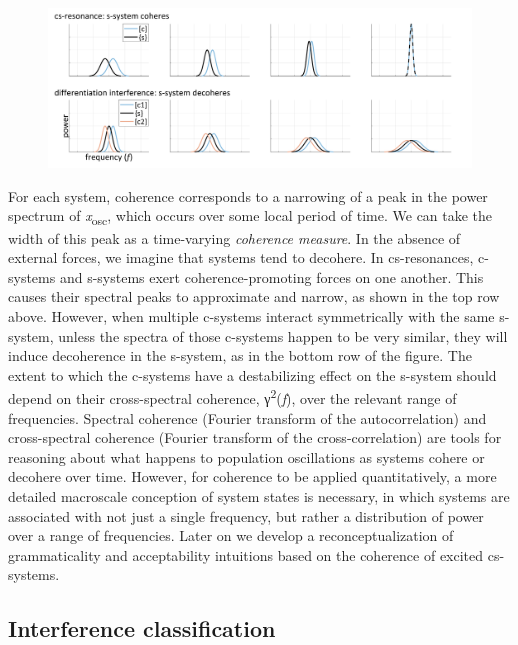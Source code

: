   
\begin{figure}
\includegraphics[width=\textwidth]{figures/Tilsen-img93.png}
\caption{\missingcaption}
\label{fig:}
\end{figure}
 

  For each system, coherence corresponds to a narrowing of a peak in the power spectrum of \textit{x}\textsubscript{osc}, which occurs over some local period of time. We can take the width of this peak as a time-varying \textit{coherence measure}. In the absence of external forces, we imagine that systems tend to decohere. In cs-resonances, c-systems and s-systems exert coherence-promoting forces on one another. This causes their spectral peaks to approximate and narrow, as shown in the top row above. However, when multiple c-systems interact symmetrically with the same s-system, unless the spectra of those c-systems happen to be very similar, they will induce decoherence in the s-system, as in the bottom row of the figure. The extent to which the c-systems have a destabilizing effect on the s-system should depend on their cross-spectral coherence, γ\textsuperscript{2}(\textit{f}), over the relevant range of frequencies. Spectral coherence (Fourier transform of the autocorrelation) and cross-spectral coherence (Fourier transform of the cross-correlation) are tools for reasoning about what happens to population oscillations as systems cohere or decohere over time. However, for coherence to be applied quantitatively, a more detailed macroscale conception of system states is necessary, in which systems are associated with not just a single frequency, but rather a distribution of power over a range of frequencies. Later on we develop a reconceptualization of grammaticality and acceptability intuitions based on the coherence of excited cs-systems.

\subsection{Interference classification}

